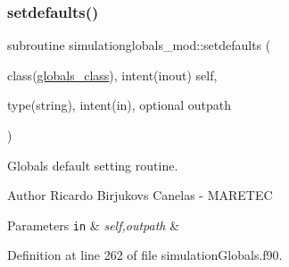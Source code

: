 \subsubsection{\texorpdfstring{setdefaults()}{setdefaults()}}
{\footnotesize\ttfamily subroutine simulationglobals\+\_\+mod\+::setdefaults (\begin{DoxyParamCaption}\item[{class(\mbox{\hyperlink{structsimulationglobals__mod_1_1globals__class}{globals\+\_\+class}}), intent(inout)}]{self,  }\item[{type(string), intent(in), optional}]{outpath }\end{DoxyParamCaption})\hspace{0.3cm}{\ttfamily [private]}}



Globals default setting routine. 

\begin{DoxyAuthor}{Author}
Ricardo Birjukovs Canelas -\/ M\+A\+R\+E\+T\+EC 
\end{DoxyAuthor}

\begin{DoxyParams}[1]{Parameters}
\mbox{\tt in}  & {\em self,outpath} & \\
\hline
\end{DoxyParams}


Definition at line 262 of file simulation\+Globals.\+f90.


